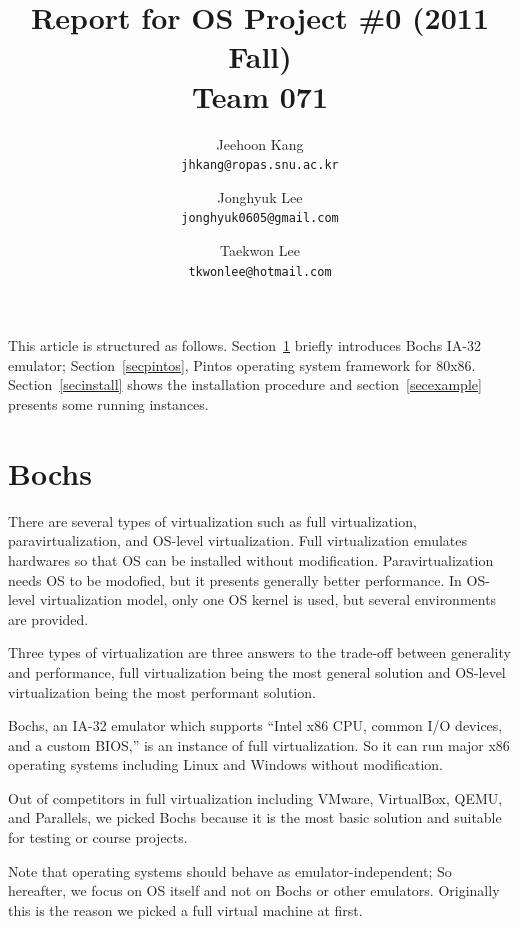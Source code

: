 \documentclass[a4paper,article,11pt,oneside]{article}
\begin{document}
\title{Report for OS Project \#0 (2011 Fall)\\Team 071}
\author{Jeehoon Kang\\\texttt{jhkang@ropas.snu.ac.kr}\and Jonghyuk Lee\\\texttt{jonghyuk0605@gmail.com} \and Taekwon Lee\\\texttt{tkwonlee@hotmail.com} }
\maketitle

This article is structured as follows. Section~\ref{secbochs} briefly
introduces Bochs IA-32 emulator\cite{bochs}; Section~\ref{secpintos},
Pintos operating system framework for
80x86\cite{pintos}. Section~\ref{secinstall} shows the installation
procedure and section~\ref{secexample} presents some running
instances.

\section{Bochs}\label{secbochs}
There are several types of virtualization such as full
virtualization, paravirtualization, and OS-level virtualization. Full
virtualization emulates hardwares so that OS can be installed without
modification. Paravirtualization needs OS to be modofied, but it
presents generally better performance. In OS-level virtualization
model, only one OS kernel is used, but several environments are
provided.

Three types of virtualization are three answers to the trade-off
between generality and performance, full virtualization being the most
general solution and OS-level virtualization being the most performant
solution.

Bochs\cite{bochs}, an IA-32 emulator which supports ``Intel x86 CPU,
common I/O devices, and a custom BIOS,'' is an instance of full
virtualization.\cite{bochs} So it can run major x86 operating systems
including Linux and Windows without modification.

Out of competitors in full virtualization including VMware,
VirtualBox, QEMU, and Parallels, we picked Bochs because it is the most
basic solution and suitable for testing or course projects.

Note that operating systems should behave as emulator-independent; So
hereafter, we focus on OS itself and not on Bochs or other
emulators. Originally this is the reason we picked a full virtual
machine at first.
\end{document}
